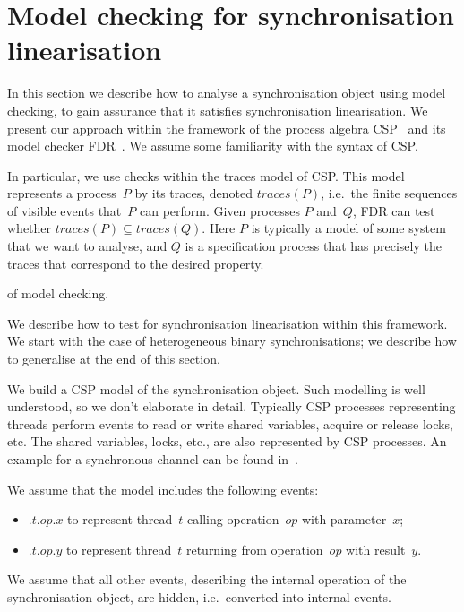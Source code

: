 \section{Model checking for synchronisation linearisation}
\label{sec:modelChecking}

In this section we describe how to analyse a synchronisation object using
model checking, to gain assurance that it satisfies synchronisation
linearisation.  We present our approach within the framework of the process
algebra CSP~\cite{awr:ucs} and its model checker FDR~\cite{fdr3,fdr-manual}.
We assume some familiarity with the syntax of CSP.

In particular, we use checks within the traces model of CSP\null.  This model
represents a process~$P$ by its traces, denoted $traces(P)$, i.e.~the finite
sequences of visible events that~$P$ can perform.  Given processes $P$
and~$Q$, FDR can test whether $traces(P) \subseteq traces(Q)$.  Here $P$ is
typically a model of some system that we want to analyse, and $Q$ is a
specification process that has precisely the traces that correspond to the
desired property.

 of model checking.

We describe how to test for synchronisation linearisation within this
framework.  We start with the case of heterogeneous binary synchronisations;
we describe how to generalise at the end of this section.

We build a CSP model of the synchronisation object.  Such modelling is well
understood, so we don't elaborate in detail.  Typically CSP processes
representing threads perform events to read or write shared variables, acquire
or release locks, etc.  The shared variables, locks, etc., are also
represented by CSP processes.  An example for a synchronous channel can be
found in~\cite{gavin:syncChan}.  

We assume that the model includes the following events:
%
\begin{itemize}
\item {}$.t.op.x$ to represent thread~$t$ calling operation~$op$ with
  parameter~$x$; 

\item {}$.t.op.y$ to represent thread~$t$ returning from
  operation~$op$ with result~$y$.
\end{itemize}
%
We assume that all other events, describing the internal operation of the
synchronisation object, are hidden, i.e.~converted into internal events.

